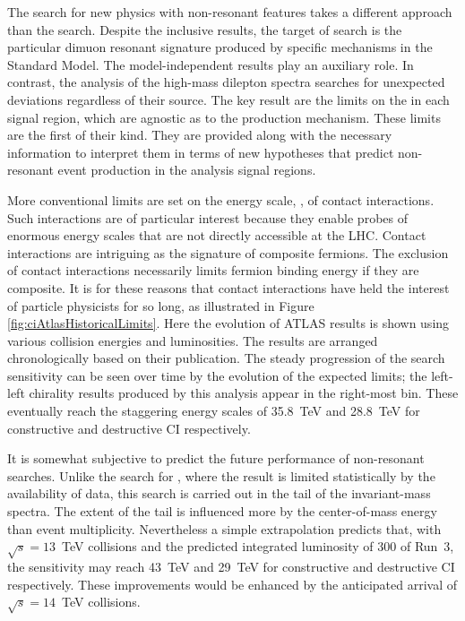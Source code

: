 The search for new physics with non-resonant features takes a different approach than the \hmm search.
Despite the inclusive results, the target of \hmm search is the particular dimuon resonant signature produced by specific mechanisms in the Standard Model.
The model-independent results play an auxiliary role.
In contrast, the analysis of the high-mass dilepton spectra searches for unexpected deviations regardless of their source.
The key result are the limits on the \xsbr in each signal region, which are agnostic as to the production mechanism.
These limits are the first of their kind.
They are provided along with the necessary information to interpret them in terms of new hypotheses that predict non-resonant event production in the analysis signal regions.

More conventional limits are set on the energy scale, \lam, of contact interactions.
Such interactions are of particular interest because they enable probes of enormous energy scales that are not directly accessible at the LHC. 
Contact interactions are intriguing as the signature of composite fermions.
The exclusion of contact interactions necessarily limits fermion binding energy if they are composite.
It is for these reasons that contact interactions have held the interest of particle physicists for so long, as illustrated in Figure \ref{fig:ciAtlasHistoricalLimits}.
Here the evolution of ATLAS results is shown using various collision energies and luminosities.
The results are arranged chronologically based on their publication.
The steady progression of the search sensitivity can be seen over time by the evolution of the expected limits; the left-left chirality results produced by this analysis appear in the right-most bin.
These eventually reach the staggering energy scales of 35.8~TeV and 28.8~TeV for constructive and destructive CI respectively.

It is somewhat subjective to predict the future performance of non-resonant searches.
Unlike the search for \hmm, where the result is limited statistically by the availability of data, this search is carried out in the tail of the invariant-mass spectra.
The extent of the tail is influenced more by the center-of-mass energy than event multiplicity.
Nevertheless a simple extrapolation predicts that, with $\sqrt{s}=13$~TeV collisions and the predicted integrated luminosity of 300 \fb of Run~3, the sensitivity may reach 43~TeV and 29~TeV for constructive and destructive CI respectively.
These improvements would be enhanced by the anticipated arrival of $\sqrt{s}=14$~TeV collisions.


